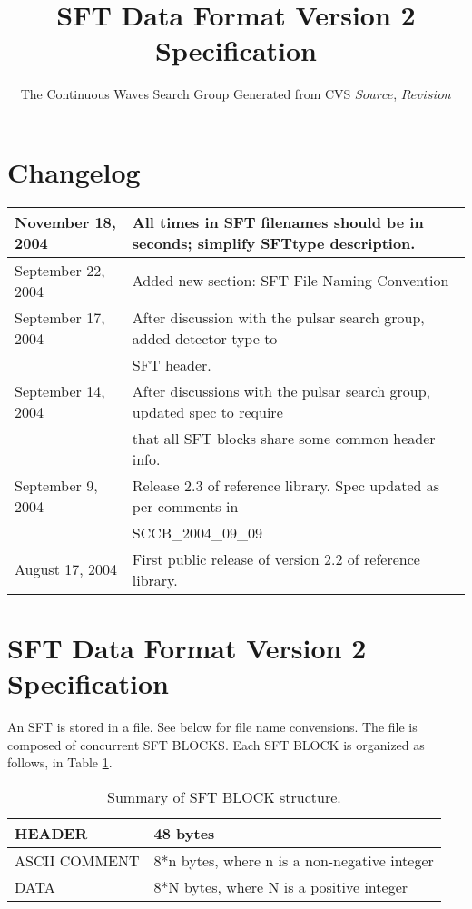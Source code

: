 \documentclass{ligodcc}
\title{SFT Data Format Version 2 Specification}
\author{The Continuous Waves Search Group \break Generated from CVS $Source$, $Revision$ }
\begin{document}
\maketitle

\section{Changelog}


\begin{table}[ht]
\centering
\begin{tabular}{|l|l|}
\hline
November 18, 2004 & All times in SFT filenames should be in seconds; simplify SFTtype description. \\
\hline
September 22, 2004 & Added new section: SFT File Naming Convention \\
\hline
September 17, 2004 & After discussion with the pulsar search group, added detector type to\\
   & SFT header. \\
\hline
September 14, 2004 & After discussions with the pulsar search group, updated spec to require\\
   & that all SFT blocks share some common header info. \\
\hline
September 9, 2004 & Release 2.3 of reference library.  Spec updated as per comments in\\
   & SCCB\_2004\_09\_09 \\
\hline
August 17, 2004  & First public release of version 2.2 of reference library. \\
\hline
\end{tabular}
\end{table}
 
\section{SFT Data Format Version 2 Specification}

An SFT is stored in a file. See below for file name convensions. The
file is composed of concurrent SFT BLOCKS. Each SFT BLOCK is organized as follows,
in Table \ref{tab:summary_struct}.

\begin{table}[ht]
\centering
\begin{tabular}{|l|l|}
\hline
   HEADER & 48 bytes\\
\hline

 ASCII COMMENT & 8*n bytes,
 where n is a non-negative
 integer\\
\hline

  DATA & 8*N bytes,
 where N is a positive
 integer\\
\hline
\end{tabular}
\caption{Summary of SFT BLOCK structure.}
\label{tab:summary_struct}
\end{table}
\end{document}
